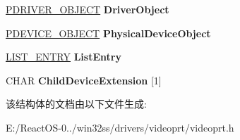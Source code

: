 \begin{DoxyCompactItemize}
\item 
\mbox{\label{struct___v_i_d_e_o___p_o_r_t___c_h_i_l_d___e_x_t_e_n_s_i_o_n_a2a3413aeeb803b0b5182d647fae9d800}} 
\hyperlink{struct___d_r_i_v_e_r___o_b_j_e_c_t}{P\+D\+R\+I\+V\+E\+R\+\_\+\+O\+B\+J\+E\+CT} {\bfseries Driver\+Object}
\item 
\mbox{\label{struct___v_i_d_e_o___p_o_r_t___c_h_i_l_d___e_x_t_e_n_s_i_o_n_a19cc336b79f41f19f80ac31e6fa3b569}} 
\hyperlink{struct___d_e_v_i_c_e___o_b_j_e_c_t}{P\+D\+E\+V\+I\+C\+E\+\_\+\+O\+B\+J\+E\+CT} {\bfseries Physical\+Device\+Object}
\item 
\mbox{\label{struct___v_i_d_e_o___p_o_r_t___c_h_i_l_d___e_x_t_e_n_s_i_o_n_ad82bb1c08b006a667495220d55d97d95}} 
\hyperlink{struct___l_i_s_t___e_n_t_r_y}{L\+I\+S\+T\+\_\+\+E\+N\+T\+RY} {\bfseries List\+Entry}
\item 
\mbox{\label{struct___v_i_d_e_o___p_o_r_t___c_h_i_l_d___e_x_t_e_n_s_i_o_n_ac2848de409e2fe90916ebc3d7527f552}} 
C\+H\+AR {\bfseries Child\+Device\+Extension} \mbox{[}1\mbox{]}
\end{DoxyCompactItemize}


该结构体的文档由以下文件生成\+:\begin{DoxyCompactItemize}
\item 
E\+:/\+React\+O\+S-\/0../win32ss/drivers/videoprt/videoprt.\+h\end{DoxyCompactItemize}
